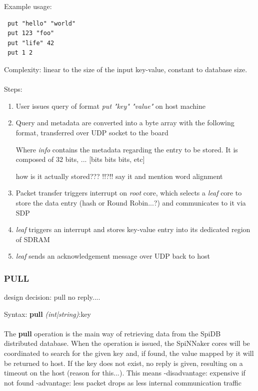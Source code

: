 \noindent
 Example usage:\\
 \begin{lstlisting}
 put "hello" "world"
 put 123 "foo"
 put "life" 42
 put 1 2
 \end{lstlisting}
\noindent 
 Complexity: linear to the size of the input key-value, constant to database size.\\\\
 
Steps:
\begin{enumerate}
\item User issues query of format \textit{put "key" "value"} on host machine
\item Query and metadata are converted into a byte array with the following format, transferred over UDP socket to the board



Where \textit{info} contains the metadata regarding the entry to be stored. It is composed of 32 bits, ...
[bits bits bits, etc]

how is it actually stored??? !!?!! say it and mention word alignment

\item Packet transfer triggers interrupt on \textit{root} core, which selects a \textit{leaf} core to store the data entry (hash or Round Robin...?) and communicates to it via SDP
\item \textit{leaf} triggers an interrupt and stores key-value entry into its dedicated region of SDRAM
\item \textit{leaf} sends an acknowledgement message over UDP back to host
\end{enumerate}

\subsubsection{PULL}


design decision: pull no reply....

 Syntax:
 \noindent
 {\large\textbf{pull} \textit{(int|string)}:key}\\\\
 
The \textbf{pull} operation is the main way of retrieving data from the SpiDB distributed database.
When the operation is issued, the SpiNNaker cores will be coordinated to search for the given key and, if found, the value mapped by it will be returned to host. If the key does not exist, no reply is given, resulting on a timeout on the host (reason for this...). This means 
-disadvantage: expensive if not found
-advantage: less packet drops as less internal communication traffic
 
